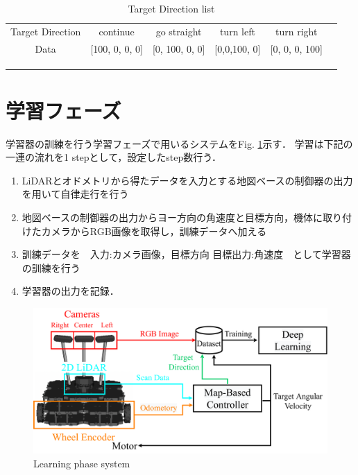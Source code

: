     \begin{table}[h]
      \centering
      \caption{Target Direction list}
      \begin{tabular}{ccccll}
      \cline{1-5}
      \multicolumn{1}{|c|}{Target Direction} & \multicolumn{1}{c|}{continue}&\multicolumn{1}{c|}{go straight}          & \multicolumn{1}{c|}{turn left}          & \multicolumn{1}{c|}{turn right}          &  \\ \cline{1-5}
      \multicolumn{1}{|c|}{Data}  &\multicolumn{1}{c|}{{[}100, 0, 0, 0{]}}& \multicolumn{1}{c|}{{[}0, 100, 0, 0{]}} & \multicolumn{1}{c|}{{[}0,0,100, 0{]}} & \multicolumn{1}{l|}{{[}0, 0, 0, 100{]}} &  \\ \cline{1-5}
                                 &                                  &                                  &                                  &  \\
                                 &                                  &                                  &                                  &  \\
      \multicolumn{1}{l}{}       &                                  &                                  &                                  & 
      \end{tabular}
      \vspace{-3.0zh}
      \label{tb:command_4}
      \end{table}

\newpage
\section{学習フェーズ}
\label{lerning}
学習器の訓練を行う学習フェーズで用いるシステムをFig. \ref{fig::learningsystem}示す．
学習は下記の一連の流れを1 stepとして，設定したstep数行う．
\begin{enumerate}
    \item LiDARとオドメトリから得たデータを入力とする地図ベースの制御器の出力を用いて自律走行を行う
    \item 地図ベースの制御器の出力からヨー方向の角速度と目標方向，機体に取り付けたカメラからRGB画像を取得し，訓練データへ加える
    \item 訓練データを　入力:カメラ画像，目標方向 目標出力:角速度　として学習器の訓練を行う
    \item 学習器の出力を記録．
  \end{enumerate}

  \begin{figure}[h]
    \centering
    \includegraphics[width = 12cm]{./figs/system_learning.pdf}
    \caption{Learning phase system }
    \label{fig::learningsystem}
\end{figure}

